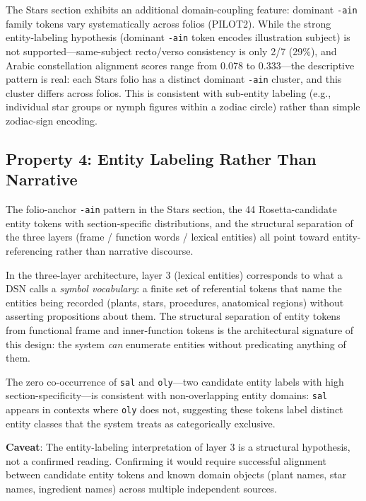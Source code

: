 \documentclass[11pt,a4paper,twocolumn]{article}
\begin{document}
The Stars section exhibits an additional domain-coupling feature: dominant \texttt{-ain} family tokens vary systematically across folios (PILOT2). While the strong entity-labeling hypothesis (dominant \texttt{-ain} token encodes illustration subject) is not supported---same-subject recto/verso consistency is only 2/7 (29\%), and Arabic constellation alignment scores range from 0.078 to 0.333---the descriptive pattern is real: each Stars folio has a distinct dominant \texttt{-ain} cluster, and this cluster differs across folios. This is consistent with sub-entity labeling (e.g., individual star groups or nymph figures within a zodiac circle) rather than simple zodiac-sign encoding.

\subsection{Property 4: Entity Labeling Rather Than Narrative}

The folio-anchor \texttt{-ain} pattern in the Stars section, the 44 Rosetta-candidate entity tokens with section-specific distributions, and the structural separation of the three layers (frame / function words / lexical entities) all point toward entity-referencing rather than narrative discourse.

In the three-layer architecture, layer 3 (lexical entities) corresponds to what a DSN calls a \textit{symbol vocabulary}: a finite set of referential tokens that name the entities being recorded (plants, stars, procedures, anatomical regions) without asserting propositions about them. The structural separation of entity tokens from functional frame and inner-function tokens is the architectural signature of this design: the system \textit{can} enumerate entities without predicating anything of them.

The zero co-occurrence of \texttt{sal} and \texttt{oly}---two candidate entity labels with high section-specificity---is consistent with non-overlapping entity domains: \texttt{sal} appears in contexts where \texttt{oly} does not, suggesting these tokens label distinct entity classes that the system treats as categorically exclusive.

\textbf{Caveat}: The entity-labeling interpretation of layer 3 is a structural hypothesis, not a confirmed reading. Confirming it would require successful alignment between candidate entity tokens and known domain objects (plant names, star names, ingredient names) across multiple independent sources.
\end{document}
